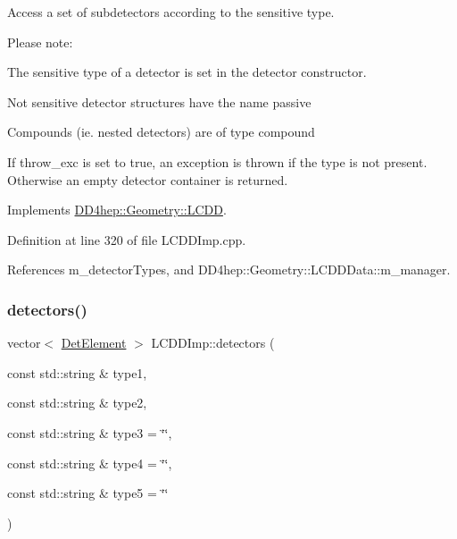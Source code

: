 Access a set of subdetectors according to the sensitive type. 

Please note\+:
\begin{DoxyItemize}
\item The sensitive type of a detector is set in the \textquotesingle{}detector constructor\textquotesingle{}.
\item Not sensitive detector structures have the name \textquotesingle{}passive\textquotesingle{}
\item Compounds (ie. nested detectors) are of type \textquotesingle{}compound\textquotesingle{}
\item If throw\+\_\+exc is set to true, an exception is thrown if the type is not present. Otherwise an empty detector container is returned. 
\end{DoxyItemize}

Implements \hyperlink{class_d_d4hep_1_1_geometry_1_1_l_c_d_d_a0f8e72265d7c6fd7d0dcdd293e13031f}{D\+D4hep\+::\+Geometry\+::\+L\+C\+DD}.



Definition at line 320 of file L\+C\+D\+D\+Imp.\+cpp.



References m\+\_\+detector\+Types, and D\+D4hep\+::\+Geometry\+::\+L\+C\+D\+D\+Data\+::m\+\_\+manager.

\hypertarget{class_d_d4hep_1_1_geometry_1_1_l_c_d_d_imp_a506c2c9e6f14c2537f6285de281b6f58}{}\label{class_d_d4hep_1_1_geometry_1_1_l_c_d_d_imp_a506c2c9e6f14c2537f6285de281b6f58} 
\subsubsection{\texorpdfstring{detectors()}{detectors()}\hspace{0.1cm}{\footnotesize\ttfamily [3/4]}}
{\footnotesize\ttfamily vector$<$ \hyperlink{class_d_d4hep_1_1_geometry_1_1_det_element}{Det\+Element} $>$ L\+C\+D\+D\+Imp\+::detectors (\begin{DoxyParamCaption}\item[{const std\+::string \&}]{type1,  }\item[{const std\+::string \&}]{type2,  }\item[{const std\+::string \&}]{type3 = {\ttfamily \char`\"{}\char`\"{}},  }\item[{const std\+::string \&}]{type4 = {\ttfamily \char`\"{}\char`\"{}},  }\item[{const std\+::string \&}]{type5 = {\ttfamily \char`\"{}\char`\"{}} }\end{DoxyParamCaption})\hspace{0.3cm}{\ttfamily [virtual]}}



